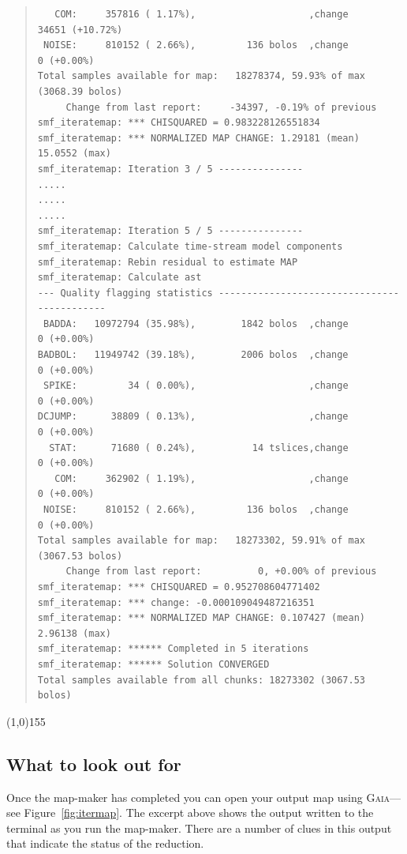 \documentclass[twoside,11pt]{article}
\newcommand{\htmlref}[2]{#1}
\newcommand{\latex}[1]{#1}
\newcommand{\latexhtml}[2]{#1}
\newcommand{\xref}[3]{#1}
\newcommand{\xlabel}[1]{}
\renewcommand{\_}{\texttt{\symbol{95}}}
\newenvironment{myquote}{\begin{quote}\begin{small}}{\end{small}\end{quote}}
\newcommand{\gaia}{\xref{\textsc{Gaia}}{sun214}{}}
\newcommand{\cref}[3]{\latexhtml{#1~\ref{#2}}{\htmlref{#3}{#2}}}
\begin{document}
\begin{myquote}
\begin{verbatim}
   COM:     357816 ( 1.17%),                    ,change      34651 (+10.72%)
 NOISE:     810152 ( 2.66%),         136 bolos  ,change          0 (+0.00%)
Total samples available for map:   18278374, 59.93% of max (3068.39 bolos)
     Change from last report:     -34397, -0.19% of previous
smf_iteratemap: *** CHISQUARED = 0.983228126551834
smf_iteratemap: *** NORMALIZED MAP CHANGE: 1.29181 (mean) 15.0552 (max)
smf_iteratemap: Iteration 3 / 5 ---------------
.....
.....
.....
smf_iteratemap: Iteration 5 / 5 ---------------
smf_iteratemap: Calculate time-stream model components
smf_iteratemap: Rebin residual to estimate MAP
smf_iteratemap: Calculate ast
--- Quality flagging statistics --------------------------------------------
 BADDA:   10972794 (35.98%),        1842 bolos  ,change          0 (+0.00%)
BADBOL:   11949742 (39.18%),        2006 bolos  ,change          0 (+0.00%)
 SPIKE:         34 ( 0.00%),                    ,change          0 (+0.00%)
DCJUMP:      38809 ( 0.13%),                    ,change          0 (+0.00%)
  STAT:      71680 ( 0.24%),          14 tslices,change          0 (+0.00%)
   COM:     362902 ( 1.19%),                    ,change          0 (+0.00%)
 NOISE:     810152 ( 2.66%),         136 bolos  ,change          0 (+0.00%)
Total samples available for map:   18273302, 59.91% of max (3067.53 bolos)
     Change from last report:          0, +0.00% of previous
smf_iteratemap: *** CHISQUARED = 0.952708604771402
smf_iteratemap: *** change: -0.000109049487216351
smf_iteratemap: *** NORMALIZED MAP CHANGE: 0.107427 (mean) 2.96138 (max)
smf_iteratemap: ****** Completed in 5 iterations
smf_iteratemap: ****** Solution CONVERGED
Total samples available from all chunks: 18273302 (3067.53 bolos)
\end{verbatim}
\end{myquote}
\vspace{-10mm}
\begin{center}
\latex{\line(1,0){155}}
\end{center}

\subsection{\xlabel{look_for}What to look out for}

Once the map-maker has completed you can open your output map using
\gaia---see \cref{Figure}{fig:itermap}{the figure below}. The excerpt
above shows the output written to the terminal as you run the map-maker. There
are a number of clues in this output that indicate the status of the
reduction.
\end{document}
